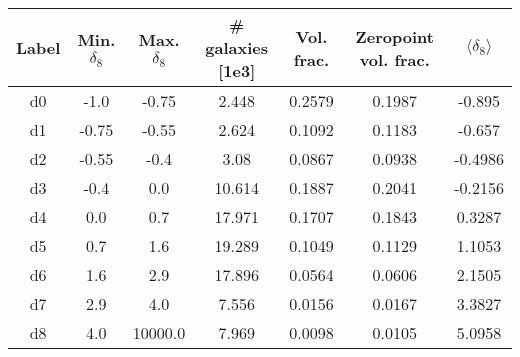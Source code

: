 \begin{table}
\begin{tabular}{ccccccc}
\hline \hline
Label & Min. $\delta_8$ & Max. $\delta_8$ & \# galaxies [1e3] & Vol. frac. & Zeropoint vol. frac. & $\langle \delta_8 \rangle$ \\
\hline
d0 & -1.0 & -0.75 & 2.448 & 0.2579 & 0.1987 & -0.895 \\
d1 & -0.75 & -0.55 & 2.624 & 0.1092 & 0.1183 & -0.657 \\
d2 & -0.55 & -0.4 & 3.08 & 0.0867 & 0.0938 & -0.4986 \\
d3 & -0.4 & 0.0 & 10.614 & 0.1887 & 0.2041 & -0.2156 \\
d4 & 0.0 & 0.7 & 17.971 & 0.1707 & 0.1843 & 0.3287 \\
d5 & 0.7 & 1.6 & 19.289 & 0.1049 & 0.1129 & 1.1053 \\
d6 & 1.6 & 2.9 & 17.896 & 0.0564 & 0.0606 & 2.1505 \\
d7 & 2.9 & 4.0 & 7.556 & 0.0156 & 0.0167 & 3.3827 \\
d8 & 4.0 & 10000.0 & 7.969 & 0.0098 & 0.0105 & 5.0958 \\
\hline
\end{tabular}
\end{table}
